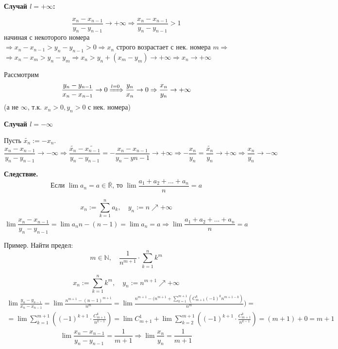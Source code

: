\documentclass[12pt,letterpaper]{report}
\makeatletter
\theoremstyle{definition}
\renewenvironment{proof}[1][\proofname]{%
   \par\pushQED{\qed}\normalfont%
   \topsep6\p@\@plus6\p@\relax
   \trivlist\item[\hskip\labelsep\bfseries#1\@addpunct{.}]%
   \ignorespaces
}{%
   \popQED\endtrivlist\@endpefalse
}
\makeatother
\begin{document}
\begin{proof}
        \textbf{Случай $l = +\infty$:}
    
        \[\frac{x_n - x_{n - 1}}{y_n - y_{n - 1}} \rightarrow +\infty
        \Rightarrow \frac{x_n - x_{n - 1}}{y_n - y_{n - 1}} > 1\] 
        начиная с некоторого номера \\
        $\Rightarrow x_n - x_{n - 1} > y_n - y_{n - 1} > 0 \Rightarrow
        x_n$ строго возрастает с нек. номера $m \Rightarrow$\\
        $\Rightarrow x_n - x_m > y_n - y_m \Rightarrow
        x_n > y_n + (x_m - y_m) \rightarrow +\infty \Rightarrow
        x_n \rightarrow +\infty$
    
        Рассмотрим
        \[\frac{y_n - y_{n - 1}}{x_n - x_{n - 1}} \rightarrow 0
        \xRightarrow[]{l = 0} \frac{y_n}{x_n} \rightarrow 0 \Rightarrow
        \frac{x_n}{y_n} \rightarrow +\infty\] (а не $\infty$, т.к. 
        $x_n > 0, y_n > 0$ с нек. номера)
    
        \textbf{Случай $l = -\infty$}
    
        Пусть $\widetilde{x_n} := -x_n$.
        \[\frac{x_n - x_{n-1}}{y_n - y_{n - 1}} \rightarrow -\infty
        \Rightarrow \frac{\widetilde{x_n} - \widetilde{x_{n-1}}}
        {y_n - y_{n - 1}} = -\frac{x_n - x_{n-1}}{y_n - y{n - 1}}
        \rightarrow +\infty \Rightarrow -\frac{x_n}{y_n} =
        \frac{\widetilde{x_n}}{y_n} \rightarrow +\infty
        \Rightarrow \frac{x_n}{y_n} \rightarrow -\infty\] 
    
    \end{proof}
    
    \textbf{Следствие.}
    \[\text{Если } \lim a_n = a \in \overline{\mathbb{R}}
    \text{, то } \lim \frac{a_1 + a_2 + ... + a_n}{n} = a\] 
    \begin{proof}
        \[x_n := \sum_{k=1}^n a_k, \quad y_n := n \nearrow +\infty\]
        \[\lim \frac{x_n - x_{n-1}}{y_n - y_{n-1}} = \lim{a_n}{n - (n - 1)}
        = \lim a_n = a \Rightarrow \lim \frac{a_1 + a_2 + ... + a_n}{n} = a\]
    \end{proof}
    
    Пример. Найти предел:
    \[m \in \mathbb{N}, \quad \frac{1}{n^{m + 1}} \cdot \sum_{k=1}^{n} k^m\]
    
    \[x_n := \sum_{k=1}^{n} k^m, \quad y_n := n^{m + 1} \nearrow +\infty\]
    \begin{gather*}
        \lim \frac{y_n - y_{n - 1}}{x_n - x_{n - 1}} =
        \lim \frac{n^{m + 1} - (n - 1)^{m + 1}}{n^m} =
        \lim \frac{n^{m+1} - (n^{m+1} + \sum_{k = 1}^{m + 1} 
        (C_{m+1}^k (-1)^k n^{m+1-k})}{n^m}) = \\
        = \lim \sum_{k = 1}^{m + 1} 
        ((-1)^{k+1} \cdot \frac{C_{m+1}^k}{n^{k - 1}}) =
        \lim C_{m + 1}^1 + \lim \sum_{k = 2}^{m + 1} 
        ((-1)^{k+1} \cdot \frac{C_{m+1}^k}{n^{k - 1}}) =
        (m + 1) + 0 = m + 1
    \end{gather*}
    \[\lim\frac{x_n - x_{n - 1}}{y_n - y_{n-1}} = \frac1{m + 1}
    \Rightarrow \lim\frac{x_n}{y_n} = \frac1{m + 1}\]
    
\end{document}
